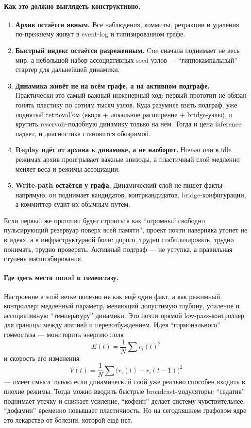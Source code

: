 \paragraph{Как это должно выглядеть конструктивно.}
\begin{enumerate}\itemsep2pt
\item \textbf{Архив остаётся явным.} Все наблюдения, коммиты, ретракции и
удаления по-прежнему живут в event-log и типизированном графе.
\item \textbf{Быстрый индекс остаётся разреженным.} Cue сначала поднимает не
весь мир, а небольшой набор ассоциативных seed-узлов --- ``гиппокампальный''
стартер для дальнейшей динамики.
\item \textbf{Динамика живёт не на всём графе, а на активном подграфе.}
Практически это самый важный инженерный ход: первый прототип не обязан
гонять пластику по сотням тысяч узлов. Куда разумнее взять подграф, уже
поднятый retrieval'ом (якоря + локальное расширение + bridge-узлы), и
крутить reservoir-подобную динамику только на нём. Тогда и цена inference
падает, и диагностика становится обозримой.
\item \textbf{Replay идёт от архива к динамике, а не наоборот.} Ночью или в
idle режимах архив проигрывает важные эпизоды, а пластичный слой медленно
меняет веса и режимы ассоциации.
\item \textbf{Write-path остаётся у графа.} Динамический слой не пишет факты
напрямую; он поднимает кандидатов, контркандидатов, bridge-конфигурации, а
коммиттер судит их обычным путём.
\end{enumerate}

\begin{pitfall}
Если первый же прототип будет строиться как ``огромный свободно
пульсирующий резервуар поверх всей памяти'', проект почти наверняка утонет
не в идеях, а в инфраструктурной боли: дорого, трудно стабилизировать, трудно
понимать, трудно проверять. Активный подграф --- не уступка, а правильная
ступень масштабирования.
\end{pitfall}

\paragraph{Где здесь место mood и гомеостазу.} Настроение в этой ветке
полезно не как ещё один факт, а как режимный контроллер: медленный
параметр, меняющий допустимую глубину, усиление и ассоциативную
``температуру'' динамики. Это почти прямой low-pass-контроллер для границы
между апатией и перевозбуждением. Идея ``гормонального'' гомеостаза ---
мониторить энергию поля
\[
E(t)=\frac{1}{N}\sum r_i(t)^2
\]
и скорость его изменения
\[
V(t)=\frac{1}{N}\sum \big(r_i(t)-r_i(t-1)\big)^2
\]
--- имеет смысл только если динамический слой уже реально способен входить в
плохие режимы. Тогда можно вводить быстрые broadcast-модуляторы: ``седатив''
поднимает утечку и снижает усиление, ``кофеин'' делает систему
чувствительнее, ``дофамин'' временно повышает пластичность. Но на
сегодняшнем графовом ядре это лекарство от болезни, которой ещё нет.

